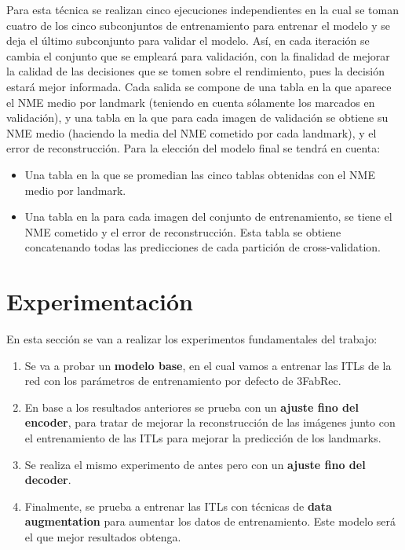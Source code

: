         \noindent Para esta técnica se realizan cinco ejecuciones independientes en la cual se toman cuatro de los cinco subconjuntos de entrenamiento para entrenar el modelo y se deja el último subconjunto para validar el modelo. Así, en cada iteración se cambia el conjunto que se empleará para validación, con la finalidad de mejorar la calidad de las decisiones que se tomen sobre el rendimiento, pues la decisión estará mejor informada. Cada salida se compone de una tabla en la que aparece el NME medio por landmark (teniendo en cuenta sólamente los marcados en validación), y una tabla en la que para cada imagen de validación se obtiene su NME medio (haciendo la media del NME cometido por cada landmark), y el error de reconstrucción. Para la elección del modelo final se tendrá en cuenta: 

        \begin{itemize}
            \item Una tabla en la que se promedian las cinco tablas obtenidas con el NME medio por landmark.
            \item Una tabla en la para cada imagen del conjunto de entrenamiento, se tiene el NME cometido y el error de reconstrucción. Esta tabla se obtiene concatenando todas las predicciones de cada partición de cross-validation.
        \end{itemize}


\section{Experimentación}

    En esta sección se van a realizar los experimentos fundamentales del trabajo:
    \begin{enumerate}
        \item Se va a probar un \textbf{modelo base}, en el cual vamos a entrenar las ITLs de la red con los parámetros de entrenamiento por defecto de 3FabRec.
        \item En base a los resultados anteriores se prueba con un \textbf{ajuste fino del encoder}, para tratar de mejorar la reconstrucción de las imágenes junto con el entrenamiento de las ITLs para mejorar la predicción de los landmarks.
        \item Se realiza el mismo experimento de antes pero con un \textbf{ajuste fino del decoder}.
        \item Finalmente, se prueba a entrenar las ITLs con técnicas de \textbf{data augmentation} para aumentar los datos de entrenamiento. Este modelo será el que mejor resultados obtenga.
    \end{enumerate}

